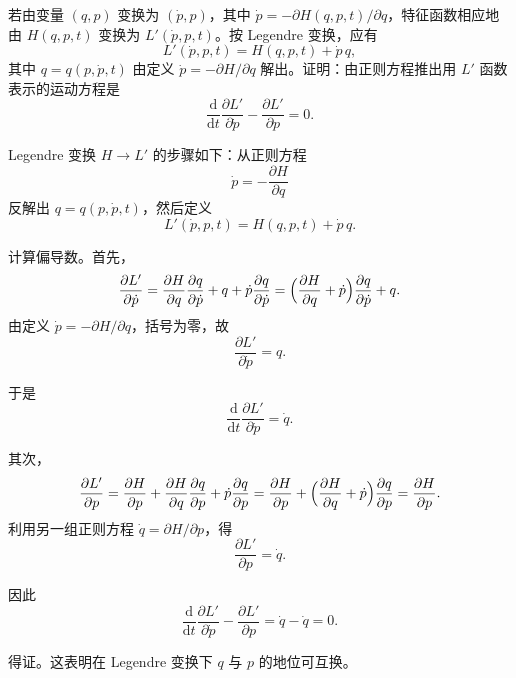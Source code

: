 



\begin{question}
若由变量 \((q,p)\) 变换为 \((\dot p,p)\)，其中 \(\dot p = -\partial H(q,p,t)/\partial q\)，特征函数相应地由 \(H(q,p,t)\) 变换为 \(L'(\dot p,p,t)\)。按 Legendre 变换，应有
\[
L'(\dot p,p,t) = H(q,p,t) + \dot p\,q,
\]
其中 \(q = q(p,\dot p,t)\) 由定义 \(\dot p = -\partial H/\partial q\) 解出。证明：由正则方程推出用 \(L'\) 函数表示的运动方程是
\[
\frac{\mathrm d}{\mathrm d t}\frac{\partial L'}{\partial\dot p} - \frac{\partial L'}{\partial p} = 0 .
\]

\begin{solution}
Legendre 变换 \(H\to L'\) 的步骤如下：从正则方程
\[
\dot p = -\frac{\partial H}{\partial q}
\]
反解出 \(q = q(p,\dot p,t)\)，然后定义
\[
L'(\dot p,p,t) = H(q,p,t) + \dot p\,q .
\]

计算偏导数。首先，
\[
\frac{\partial L'}{\partial\dot p}
= \frac{\partial H}{\partial q}\frac{\partial q}{\partial\dot p} + q + \dot p\frac{\partial q}{\partial\dot p}
= \Bigl(\frac{\partial H}{\partial q} + \dot p\Bigr)\frac{\partial q}{\partial\dot p} + q .
\]
由定义 \(\dot p = -\partial H/\partial q\)，括号为零，故
\[
\frac{\partial L'}{\partial\dot p} = q .
\]

于是
\[
\frac{\mathrm d}{\mathrm d t}\frac{\partial L'}{\partial\dot p} = \dot q .
\]

其次，
\[
\frac{\partial L'}{\partial p}
= \frac{\partial H}{\partial p} + \frac{\partial H}{\partial q}\frac{\partial q}{\partial p}
+ \dot p\frac{\partial q}{\partial p}
= \frac{\partial H}{\partial p} + \Bigl(\frac{\partial H}{\partial q} + \dot p\Bigr)\frac{\partial q}{\partial p}
= \frac{\partial H}{\partial p} .
\]
利用另一组正则方程 \(\dot q = \partial H/\partial p\)，得
\[
\frac{\partial L'}{\partial p} = \dot q .
\]

因此
\[
\frac{\mathrm d}{\mathrm d t}\frac{\partial L'}{\partial\dot p} - \frac{\partial L'}{\partial p}
= \dot q - \dot q = 0 .
\]

 得证。这表明在 Legendre 变换下 \(q\) 与 \(p\) 的地位可互换。
\end{solution}
\end{question}


